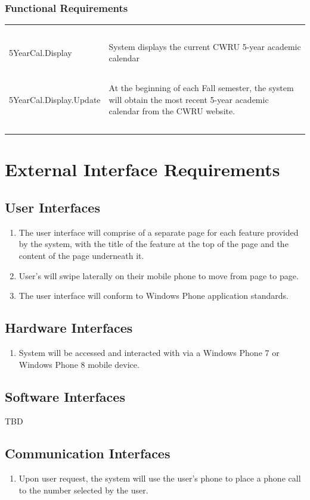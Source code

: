 \documentclass[pdftex,12pt,letter]{article}
\begin{document}
\subsubsection{Functional Requirements}
\begin{table}[!h]
\begin{tabularx}{\textwidth}[t]{|l Y|}
\hline
~&~\\
5YearCal.Display & System displays the current CWRU 5-year academic calendar\\ 
~&~\\
5YearCal.Display.Update & At the beginning of each Fall semester, the system will obtain the most recent 5-year academic calendar from the CWRU website.\\
~&~\\
\hline
\end{tabularx}
\end{table}
\FloatBarrier
\section{External Interface Requirements}
\subsection{User Interfaces}
\begin{enumerate}[UI-1:]
\item The user interface will comprise of a separate page for each feature provided by the system, with the title of the feature at the top of the page and the content of the page underneath it.
\item User's will swipe laterally on their mobile phone to move from page to page.
\item The user interface will conform to Windows Phone application standards.
\end{enumerate}
\subsection{Hardware Interfaces}
\begin{enumerate}[HI-1:]
\item System will be accessed and interacted with via a Windows Phone 7 or Windows Phone 8 mobile device.
\end{enumerate}
\subsection{Software Interfaces}
TBD
\subsection{Communication Interfaces}
\begin{enumerate}[CI-1]
\item Upon user request, the system will use the user's phone to place a phone call to the number selected by the user.
\end{enumerate}
\end{document}
